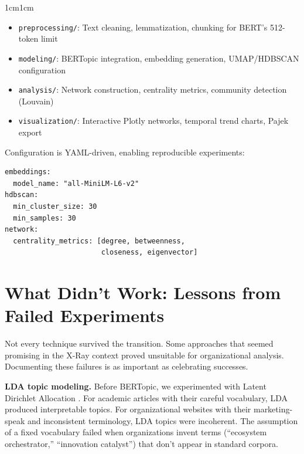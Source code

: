 \documentclass[../main.tex]{subfiles}
\begin{document}
\begin{adjustwidth}{1cm}{1cm}

\begin{itemize}[leftmargin=2em, itemsep=0.1em]
    \item \texttt{preprocessing/}: Text cleaning, lemmatization, chunking for BERT's 512-token limit
    \item \texttt{modeling/}: BERTopic integration, embedding generation, UMAP/HDBSCAN configuration
    \item \texttt{analysis/}: Network construction, centrality metrics, community detection (Louvain)
    \item \texttt{visualization/}: Interactive Plotly networks, temporal trend charts, Pajek export
\end{itemize}

\noindent Configuration is YAML-driven, enabling reproducible experiments:

\begin{verbatim}
embeddings:
  model_name: "all-MiniLM-L6-v2"
hdbscan:
  min_cluster_size: 30
  min_samples: 30
network:
  centrality_metrics: [degree, betweenness,
                       closeness, eigenvector]
\end{verbatim}


\vspace{0.8cm}

\section*{What Didn't Work: Lessons from Failed Experiments}

Not every technique survived the transition. Some approaches that seemed promising in the X-Ray context proved unsuitable for organizational analysis. Documenting these failures is as important as celebrating successes.


\noindent\textbf{LDA topic modeling.} Before BERTopic, we experimented with Latent Dirichlet Allocation \cite{blei2003lda}. For academic articles with their careful vocabulary, LDA produced interpretable topics. For organizational websites with their marketing-speak and inconsistent terminology, LDA topics were incoherent. The assumption of a fixed vocabulary failed when organizations invent terms (``ecosystem orchestrator,'' ``innovation catalyst'') that don't appear in standard corpora.


\end{adjustwidth}
\end{document}

